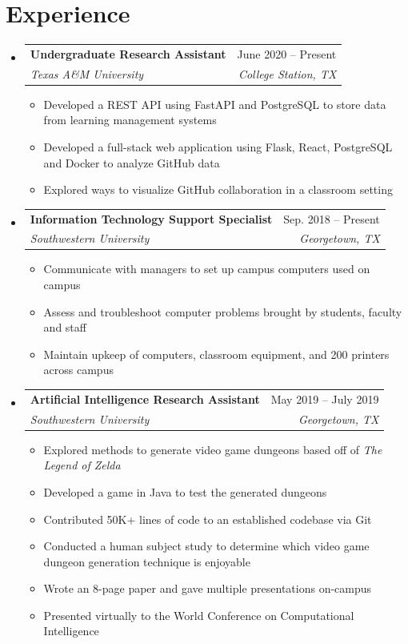 \documentclass[letterpaper,11pt]{article}
\makeatletter
\newcommand{\resumeItem}[1]{
  \item\small{
    {#1 \vspace{-2pt}}
  }
}
\newcommand{\resumeSubheading}[4]{
  \vspace{-2pt}\item
    \begin{tabular*}{0.97\textwidth}[t]{l@{\extracolsep{\fill}}r}
      \textbf{#1} & #2 \\
      \textit{\small#3} & \textit{\small #4} \\
    \end{tabular*}\vspace{-7pt}
}
\newcommand{\resumeSubSubheading}[2]{
    \item
    \begin{tabular*}{0.97\textwidth}{l@{\extracolsep{\fill}}r}
      \textit{\small#1} & \textit{\small #2} \\
    \end{tabular*}\vspace{-7pt}
}
\newcommand{\resumeSubHeadingListStart}{\begin{itemize}[leftmargin=0.15in, label={}]}
\newcommand{\resumeSubHeadingListEnd}{\end{itemize}}
\newcommand{\resumeItemListStart}{\begin{itemize}}
\newcommand{\resumeItemListEnd}{\end{itemize}\vspace{-5pt}}
\makeatother
\begin{document}
\section{Experience}
\resumeSubHeadingListStart

\resumeSubheading
{Undergraduate Research Assistant}{June 2020 -- Present}
{Texas A\&M University}{College Station, TX}
\resumeItemListStart
\resumeItem{Developed a REST API using FastAPI and PostgreSQL to store data from learning management systems}
\resumeItem{Developed a full-stack web application using Flask, React, PostgreSQL and Docker to analyze GitHub data}
\resumeItem{Explored ways to visualize GitHub collaboration in a classroom setting}
\resumeItemListEnd


\resumeSubheading
{Information Technology Support Specialist}{Sep. 2018 -- Present}
{Southwestern University}{Georgetown, TX}
\resumeItemListStart
\resumeItem{Communicate with managers to set up campus computers used on campus}
\resumeItem{Assess and troubleshoot computer problems brought by students, faculty and staff}
\resumeItem{Maintain upkeep of computers, classroom equipment, and 200 printers across campus}
\resumeItemListEnd

\resumeSubheading
{Artificial Intelligence Research Assistant}{May 2019 -- July 2019}
{Southwestern University}{Georgetown, TX}
\resumeItemListStart
\resumeItem{Explored methods to generate video game dungeons based off of \emph{The Legend of Zelda}}
\resumeItem{Developed a game in Java to test the generated dungeons}
\resumeItem{Contributed 50K+ lines of code to an established codebase via Git}
\resumeItem{Conducted  a human subject study to determine which video game dungeon generation technique is enjoyable}
\resumeItem{Wrote an 8-page paper and gave multiple presentations on-campus}
\resumeItem{Presented virtually to the World Conference on Computational Intelligence}
\resumeItemListEnd

\resumeSubHeadingListEnd


\end{document}
